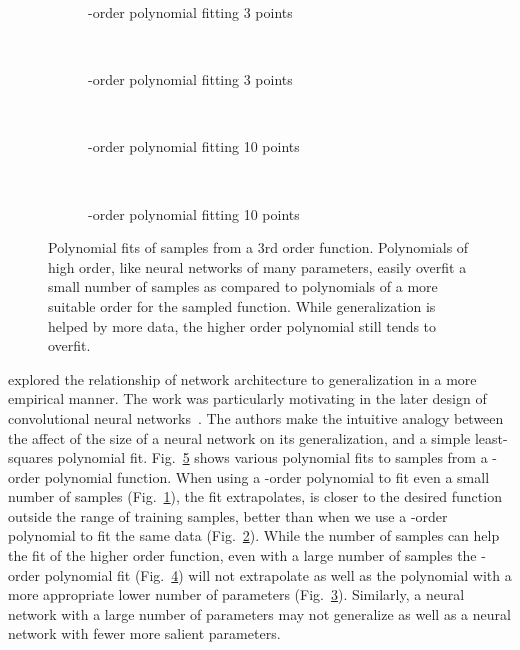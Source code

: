 \documentclass[thesis]{subfiles}
\begin{document}
	\begin{figure}[tb]
		\centering
		\begin{subfigure}[t]{0.49\textwidth}
			\resizebox{\linewidth}{!}{}
			\caption{-order polynomial fitting 3 points}
			\label{fig:polyfit3rd}
		\end{subfigure}
		~
		\begin{subfigure}[t]{0.49\textwidth}
			\resizebox{\linewidth}{!}{}
			\caption{-order polynomial fitting 3 points}
			\label{fig:polyfit20th}
		\end{subfigure}\\	
		\begin{subfigure}[t]{0.49\textwidth}
			\resizebox{\linewidth}{!}{}
			\caption{-order polynomial fitting 10 points}
			\label{fig:polyfit3rdlots}
		\end{subfigure}
		~
		\begin{subfigure}[t]{0.49\textwidth}
			\resizebox{\linewidth}{!}{}
			\caption{-order polynomial fitting 10 points}
			\label{fig:polyfit20thlots}
		\end{subfigure}
		\caption[Polynomial Data Fitting]{Polynomial fits of samples from a 3rd order function. Polynomials of high order, like neural networks of many parameters, easily overfit a small number of samples as compared to polynomials of a more suitable order for the sampled function. While generalization is helped by more data, the higher order polynomial still tends to overfit.}
		\label{fig:polyfits}
	\end{figure}

	\citet{denker1987large} explored the relationship of network architecture to generalization in a more empirical manner. The work was particularly motivating in the later design of convolutional neural networks~\citep{lecun1989generalization, lecun1989backpropagation}. The authors make the intuitive analogy between the affect of the size of a neural network on its generalization, and a simple least-squares polynomial fit. Fig.~\ref{fig:polyfits} shows various polynomial fits to samples from a -order polynomial function. When using a -order polynomial to fit even a small number of samples (Fig.~\ref{fig:polyfit3rd}), the fit extrapolates, \ie is closer to the desired function outside the range of training samples, better than when we use a -order polynomial to fit the same data (Fig.~\ref{fig:polyfit20th}). While the number of samples can help the fit of the higher order function, even with a large number of samples the -order polynomial fit  (Fig.~\ref{fig:polyfit20thlots}) will not extrapolate as well as the polynomial with a more appropriate lower number of parameters (Fig.~\ref{fig:polyfit3rdlots}). Similarly, a neural network with a large number of parameters may not generalize as well as a neural network with fewer more salient parameters.
    
\end{document}
